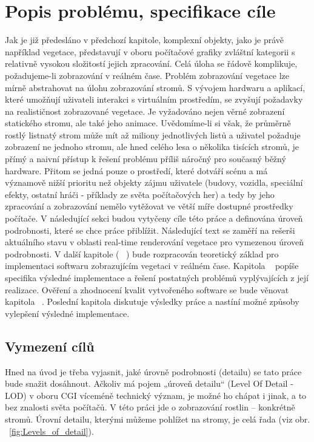 \chapter{Popis problému, specifikace cíle}
\label{chap:cile}


Jak je již předesláno v předchozí kapitole, komplexní objekty, jako je právě například vegetace, představují v oboru počítačové grafiky zvláštní kategorii s relativně vysokou složitostí jejich zpracování. Celá úloha se řádově komplikuje, požadujeme-li zobrazování v reálném čase. Problém zobrazování vegetace lze mírně abstrahovat na úlohu zobrazování stromů. S vývojem hardwaru a aplikací, které umožňují uživateli interakci s virtuálním prostředím, se zvyšují požadavky na realističnost zobrazované vegetace. Je vyžadováno nejen věrné zobrazení statického stromu, ale také jeho animace. Uvědomíme-li si však, že průměrně rostlý listnatý strom může mít až miliony jednotlivých listů a uživatel požaduje zobrazení ne jednoho stromu, ale hned celého lesa o několika tisících stromů, je přímý a naivní přístup k řešení problému příliš náročný pro současný běžný hardware. Přitom se jedná pouze o prostředí, které dotváří scénu a má významově nižší prioritu než objekty zájmu uživatele (budovy, vozidla, speciální efekty, ostatní hráči - příklady ze světa počítačových her) a tedy by jeho zpracování a zobrazování nemělo vytěžovat ve větší míře dostupné prostředky počítače.
	V následující sekci budou vytyčeny cíle této práce a definována úroveň podrobnosti, které se chce práce přiblížit. Následující text se zaměří na rešerši aktuálního stavu v oblasti real-time renderování vegetace pro vymezenou úroveň podrobnosti. V další kapitole (~ ) bude rozpracován teoretický základ pro implementaci softwaru zobrazujícím vegetaci v reálném čase. Kapitola ~ popíše specifika výsledné implementace a řešení postatných problémů vyplývajících z její realizace. Ověření a zhodnocení kvalit vytvořeného software se bude věnovat kapitola  ~. Poslední kapitola diskutuje výsledky práce a nastíní možné způsoby vylepšení výsledné implementace.

\section{Vymezení cílů}
Hned na úvod je třeba vyjasnit, jaké úrovně podrobnosti (detailu) se tato práce bude snažit dosáhnout. Ačkoliv má pojem „úroveň detailu“ (Level Of Detail - LOD) v oboru CGI víceméně technický význam, je možné ho chápat i jinak, a to bez znalosti světa počítačů. V této práci jde o zobrazování rostlin – konkrétně stromů. Úrovní detailu, kterými můžeme pohlížet na stromy, je celá řada (viz obr. ~\ref{fig:Levels_of_detail}). 

